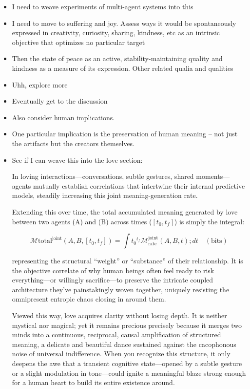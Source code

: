 \begin{itemize}
    \item I need to weave experiments of multi-agent systems into this
    \item I need to move to suffering and joy. Assess ways it would be spontaneously expressed in creativity, curiosity, sharing, kindness, etc as an intrinsic objective that optimizes no particular target
    \item Then the state of peace as an active, stability-maintaining quality and kindness as a measure of its expression. Other related qualia and qualities
    \item Uhh, explore more
    \item Eventually get to the discussion
    \item Also consider human implications.
    \item One particular implication is the preservation of human meaning -- not just the artifacts but the creators themselves.
    \item See if I can weave this into the love section:
    
    In loving interactions---conversations, subtle gestures, shared moments---agents mutually establish correlations that intertwine their internal predictive models, steadily increasing this joint meaning-generation rate.
    
    Extending this over time, the total accumulated meaning generated by love between two agents (A) and (B) across times ($[t_0,t_f]$) is simply the integral:
    
    \[
    \mathcal{M}{\text{total}}^{\text{joint}}(A,B,[t_0,t_f]) = \int{t_0}^{t_f}\mathcal{M}_{\text{rate}}^{\text{joint}}(A,B,t);dt \quad (\text{bits})
    \]
    
    representing the structural ``weight'' or ``substance'' of their relationship. It is the objective correlate of why human beings often feel ready to risk everything---or willingly sacrifice---to preserve the intricate coupled architecture they've painstakingly woven together, uniquely resisting the omnipresent entropic chaos closing in around them.
    
    Viewed this way, love acquires clarity without losing depth. It is neither mystical nor magical; yet it remains precious precisely because it merges two minds into a continuous, reciprocal, causal amplification of structured meaning, a delicate and beautiful dance sustained against the cacophonous noise of universal indifference. When you recognize this structure, it only deepens the awe that a transient cognitive state---opened by a subtle gesture or a slight modulation in tone---could ignite a meaningful blaze strong enough for a human heart to build its entire existence around.
    

\end{itemize}
